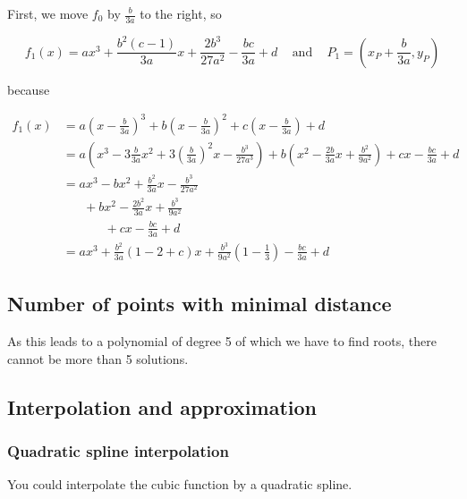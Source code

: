 First, we move $f_0$ by $\frac{b}{3a}$ to the right, so

\[f_1(x) = ax^3 + \frac{b^2 (c-1)}{3a} x + \frac{2b^3}{27 a^2} - \frac{bc}{3a} + d \;\;\;\text{ and }\;\;\;P_1 = (x_P + \frac{b}{3a}, y_P)\]

because

\begin{align}
    f_1(x) &= a \left (x - \frac{b}{3a} \right )^3 + b \left (x-\frac{b}{3a} \right )^2 + c \left (x-\frac{b}{3a} \right ) + d\\
           &= a \left (x^3 - 3 \frac{b}{3a}x^2 + 3 (\frac{b}{3a})^2 x - \frac{b^3}{27a^3} \right )
             +b \left (x^2 - \frac{2b}{3a} x + \frac{b^2}{9a^2} \right )
             +c x - \frac{bc}{3a} + d\\
            &= ax^3 - bx^2 + \frac{b^2}{3a}x - \frac{b^3}{27 a^2}\\
            & \;\;\;\;\;\;+ bx^2 - \frac{2b^2}{3a}x + \frac{b^3}{9a^2}\\
            & \;\;\;\;\;\;\;\;\;\;\;\; + c x - \frac{bc}{3a} + d\\
            &= ax^3 + \frac{b^2}{3a}\left (1-2+c \right )x + \frac{b^3}{9a^2} \left (1-\frac{1}{3} \right )- \frac{bc}{3a} + d
\end{align}

\subsection{Number of points with minimal distance}
As this leads to a polynomial of degree 5 of which we have to find
roots, there cannot be more than 5 solutions.


\subsection{Interpolation and approximation}
\subsubsection{Quadratic spline interpolation}
You could interpolate the cubic function by a quadratic spline.

